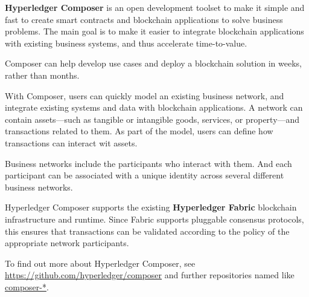 \textbf{Hyperledger Composer} is an open development toolset to make it simple and fast to create smart contracts and blockchain applications to solve business problems.  
The main goal is to make it easier to integrate blockchain applications with existing business systems, and thus accelerate time-to-value. 

Composer can help develop use cases and deploy a blockchain solution in weeks, rather than months. 

With Composer, users can quickly model an existing business network, and integrate existing systems and data with blockchain applications. 
A network can contain assets---such as tangible or intangible goods, services, or property---and transactions related to them. 
As part of the model, users can define how transactions can interact wit assets. 

Business networks include the participants who interact with them. And each participant can be associated with a unique identity across several different business networks.

Hyperledger Composer supports the existing \textbf{Hyperledger Fabric} blockchain infrastructure and runtime. 
Since Fabric supports pluggable consensus protocols, this ensures that transactions can be validated according to the policy of the appropriate network participants.

To find out more about Hyperledger Composer, see \url{https://github.com/hyperledger/composer} and further repositories named like \url{composer-*}.